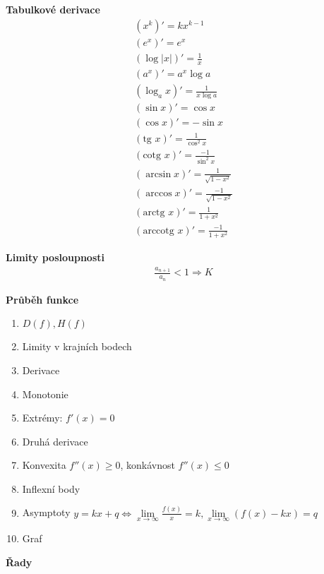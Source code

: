 \documentclass[8pt, a4paper]{extarticle}
\begin{document}
\begin{multicols}{3}
\textbf{Tabulkové derivace}
\begin{align*}
(x^k)'=kx^{k-1}\\
(e^x)'=e^x\\
(\log|x|)'=\frac{1}{x}\\
(a^x)'=a^x \log a\\
(\log_a x)'=\frac{1}{x\log a}\\
(\sin x)'= \cos x\\
(\cos x)'= -\sin x\\
(\text{tg } x)'= \frac{1}{\cos^2x}\\
(\text{cotg }x)'=\frac{-1}{\sin^2x}\\
(\arcsin x)'=\frac{1}{\sqrt{1-x^2}}\\
(\arccos x)'=\frac{-1}{\sqrt{1-x^2}}\\
(\text{arctg } x)'=\frac{1}{1+x^2}\\
(\text{arccotg }x)'=\frac{-1}{1+x^2} 
\end{align*}
 
\textbf{Limity posloupnosti}
\begin{align*}
\frac{a_{n+1}}{a_n}<1 \Rightarrow K
\end{align*}
 
\textbf{Průběh funkce}
\begin{enumerate}
\item $D(f), H(f)$
\item Limity v krajních bodech
\item Derivace
\item Monotonie
\item Extrémy: $f'(x)=0$
\item Druhá derivace
\item Konvexita $f''(x)\ge0$, konkávnost $f''(x)\le0$
\item Inflexní body
\item Asymptoty $y=kx+q \Leftrightarrow 
\lim\limits_{x \rightarrow\infty}\frac{f(x)}{x}=k,
\lim\limits_{x \rightarrow\infty}(f(x)-kx)=q$
\item Graf
\end{enumerate}
 
 
\textbf{Řady}
 

\end{multicols}
\end{document}

